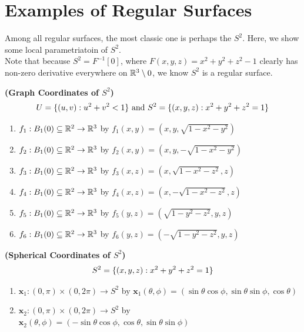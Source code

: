 \documentclass{report}
\begin{document}
\section{Examples of Regular Surfaces}
\begin{mdframed}
Among all regular surfaces, the most classic one is perhaps the $S^2$. Here, we show some local parametriatoin of $S^2$.\\


Note that because  $S^2=F^{-1}[0]$, where $F(x,y,z)=x^2+y^2+z^2-1$ clearly has non-zero derivative everywhere on $\mathbb{R}^3 \setminus 0$, we know $S^2$ is a regular surface. 
\end{mdframed}
\begin{mdframed}
\begin{Example}{\textbf{(Graph Coordinates of $S^2$)}}{}
\begin{align*}
U=\{ (u,v):u^2+v^2<1 \}\text{ and }S^2=\{ (x,y,z):x^2+y^2+z^2=1 \}
\end{align*}
\begin{enumerate}[label=(\alph*)]
    \item $f_1:B_{1}(0)\subseteq \mathbb{R}^2 \rightarrow \mathbb{R}^3$ by $f_1(x,y)=(x,y,\sqrt{1-x^2-y^2})$  
    \item $f_2:B_{1}(0)\subseteq \mathbb{R}^2 \rightarrow \mathbb{R}^3$ by $f_2(x,y)=(x,y,-\sqrt{1-x^2-y^2})$  
    \item $f_3:B_{1}(0)\subseteq \mathbb{R}^2 \rightarrow \mathbb{R}^3$ by $f_3(x,z)=(x,\sqrt{1-x^2-z^2},z)$  
    \item $f_4:B_{1}(0)\subseteq \mathbb{R}^2 \rightarrow \mathbb{R}^3$ by $f_4(x,z)=(x,-\sqrt{1-x^2-z^2},z)$  
    \item $f_5:B_{1}(0)\subseteq \mathbb{R}^2 \rightarrow \mathbb{R}^3$ by $f_5(y,z)=(\sqrt{1-y^2-z^2},y,z)$  
    \item $f_6:B_{1}(0)\subseteq \mathbb{R}^2 \rightarrow \mathbb{R}^3$ by $f_6(y,z)=(-\sqrt{1-y^2-z^2},y,z)$  
\end{enumerate}
\end{Example}  
\begin{Example}{\textbf{(Spherical Coordinates of $S^2$)}}{}
\begin{align*}
S^2=\{ (x,y,z):x^2+y^2+z^2=1 \}
\end{align*}
\begin{enumerate}[label=(\alph*)]
  \item $\textbf{x}_1:(0,\pi)\times (0,2\pi)\rightarrow S^2 $ by $\textbf{x}_1(\theta,\phi)=(\sin \theta \cos \phi,\sin \theta \sin \phi,\cos \theta)$
  \item $\textbf{x}_2:(0,\pi)\times (0,2\pi)\rightarrow S^2$ by $\textbf{x}_2(\theta,\phi)=(-\sin \theta\cos \phi  ,\cos \theta,\sin \theta \sin \phi )$

\end{enumerate}
\end{Example}
\end{mdframed}
\end{document}

